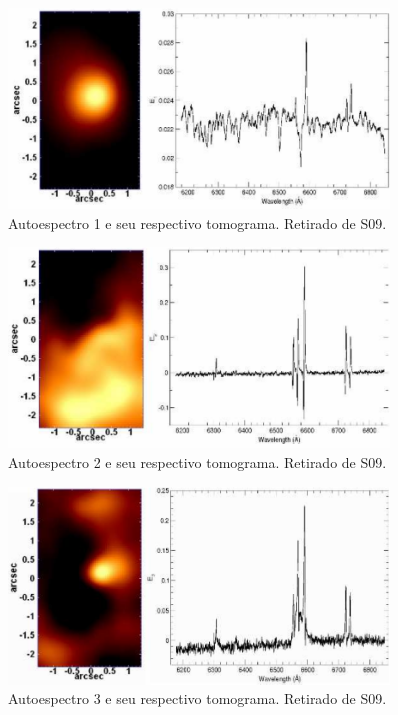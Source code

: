 \begin{figure}
    \includegraphics[width=0.9\textwidth]{figuras/figSteiner2009figA1.pdf}
    \caption[Tomograma e autoespectro 1 da galáxia NGC 4736.]
    {Autoespectro 1 e seu respectivo tomograma. Retirado de S09.}
    \label{fig:S09eigspec1}
\end{figure}

\begin{figure}
    \includegraphics[width=0.9\textwidth]{figuras/figSteiner2009figA2.pdf}
    \caption[Tomograma e autoespectro 2 da galáxia NGC 4736.]
    {Autoespectro 2 e seu respectivo tomograma. Retirado de S09.}
    \label{fig:S09eigspec2}
\end{figure}

\begin{figure}
    \includegraphics[width=0.9\textwidth]{figuras/figSteiner2009figA3.pdf}
    \caption[Tomograma e autoespectro 3 da galáxia NGC 4736.]
    {Autoespectro 3 e seu respectivo tomograma. Retirado de S09.}
    \label{fig:S09eigspec3}
\end{figure}


